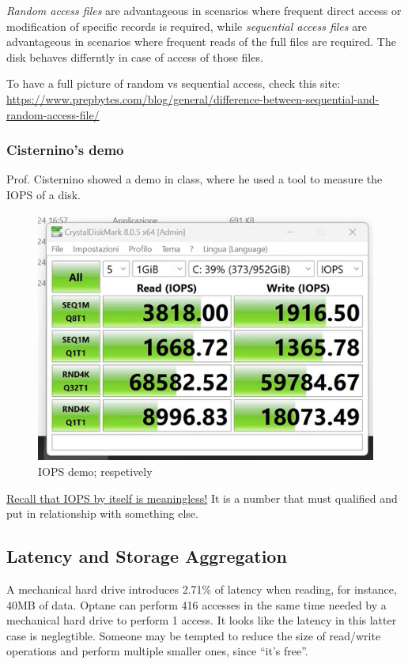 \textit{Random access files} are advantageous in scenarios where frequent direct access or modification of specific records is required, while \textit{sequential access files} are advantageous in scenarios where frequent reads of the full files are required. The disk behaves differntly in case of access of those files.

To have a full picture of random vs sequential access, check this site: \url{https://www.prepbytes.com/blog/general/difference-between-sequential-and-random-access-file/} 

\newpage
\subsubsection{Cisternino's demo}
Prof. Cisternino showed a demo in class, where he used a tool to measure the IOPS of a disk.
\begin{figure}[htbp]
   \centering
   \includegraphics{images/iops.png}
   \caption{IOPS demo; respetively}
   \label{fig:iops}
\end{figure}

\ul{Recall that IOPS by itself is meaningless!} It is a number that must qualified and put in relationship with something else.

\subsection{Latency and Storage Aggregation}
A mechanical hard drive introduces 2.71\% of latency when reading, for instance, 40MB of data.  Optane can perform 416 accesses in the same time needed by a mechanical hard drive to perform 1 access. It looks like the latency in this latter case is neglegtible. Someone may be tempted to reduce the size of read/write operations and perform multiple smaller ones, since ``it's free''. 


